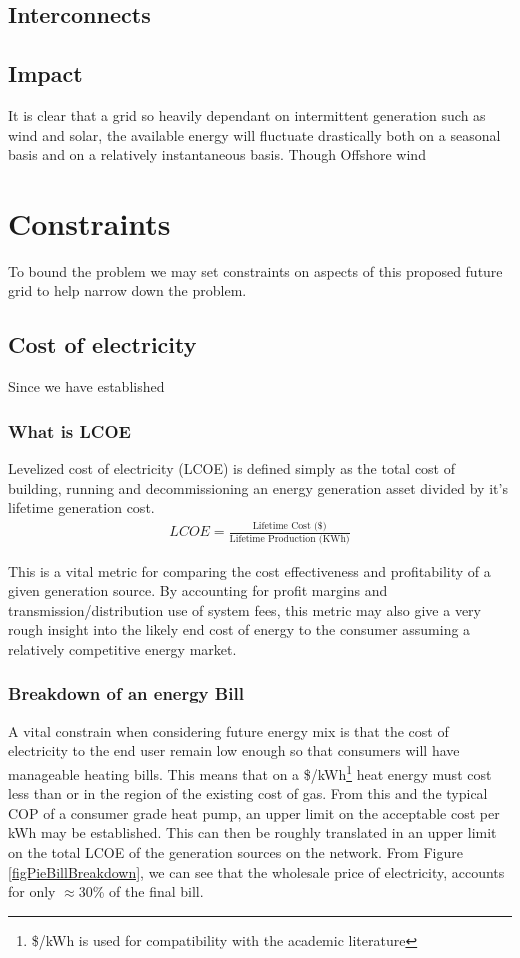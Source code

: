 \documentclass[11pt]{article}
\numberwithin{equation}{section}
\begin{document}
\subsection{Interconnects}
\label{sec:org76ba9fb}
\subsection{Impact}
\label{sec:org4d47a4a}
It is clear that a grid so heavily dependant on intermittent generation such as wind and solar, the available energy will fluctuate drastically both on a seasonal basis and on a relatively instantaneous basis. Though Offshore wind
\section{Constraints}
\label{sec:org4132870}
To bound the problem we may set constraints on aspects of this proposed future grid to help narrow down the problem.

\subsection{Cost of electricity}
\label{sec:org7b7fdc2}
Since we have established
\subsubsection{What is LCOE}
\label{sec:orgbc8f357}
Levelized cost of electricity (LCOE) is defined simply as the total cost of building, running and decommissioning an energy generation asset divided by it's lifetime generation cost.
\begin{align}
\label{eqLCOE}
LCOE = \frac{\text{Lifetime Cost (\$)}}{\text{Lifetime Production (KWh)}}
\end{align}

This is a vital metric for comparing the cost effectiveness and profitability of a given generation source. By accounting for profit margins and transmission/distribution use of system fees, this metric may also give a very rough insight into the likely end cost of energy to the consumer assuming a relatively competitive energy market.

\subsubsection{Breakdown of an energy Bill}
\label{sec:org8c06fae}
A vital constrain when considering future energy mix is that the cost of electricity to the end user remain low enough so that consumers will have manageable heating bills. This means that on a \$/kWh\footnote{\$/kWh is used for compatibility with the academic literature} heat energy must cost less than or in the region of the existing cost of gas. From this and the typical COP of a consumer grade heat pump, an upper limit on the acceptable cost per kWh may be established. This can then be roughly translated in an upper limit on the total LCOE of the generation sources on the network. From Figure \ref{figPieBillBreakdown}, we can see that the wholesale price of electricity, accounts for only \(\approx\)30\% of the final bill.
\end{document}
